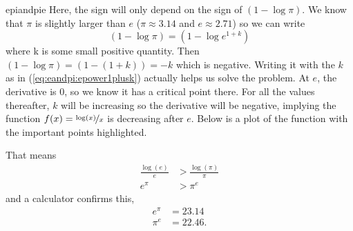\begin{answer}{epiandpie}
Here, the sign will only depend on the sign of
$(1 - \log \pi)$.
We know that $\pi$ is slightly larger than $e$
($\pi \approx 3.14$ and $e \approx 2.71$)
so we can write
\begin{equation}
\label{eq:eandpi:epower1plusk}
(1 - \log \pi)
=
(1 - \log e^{1 + k})
\end{equation}
where k is some small positive quantity.
Then
$(1 - \log \pi) =
(1 - (1 + k) ) = - k $ which is negative.
Writing it with the $k$ as in (\ref{eq:eandpi:epower1plusk}) actually helps us solve the problem.
At $e$, the derivative is 0, so we know it has a critical point there.
For all the values thereafter, $k$ will be increasing so the derivative will be negative, implying the function $f(x)=\nicefrac{\log(x)}{x}$ is decreasing after $e$.
Below is a plot of the function with the important points highlighted.
\begin{center}
\end{center}
That means
\begin{align*}
\frac{\log(e)}{e}
&>
\frac{\log(\pi)}{\pi}
\\
e^\pi
&>
\pi^e
\end{align*}
and a calculator confirms this,
\begin{align*}
e^\pi &= 23.14
\\
\pi^e &= 22.46
\text{.}
\end{align*}
\end{answer}
